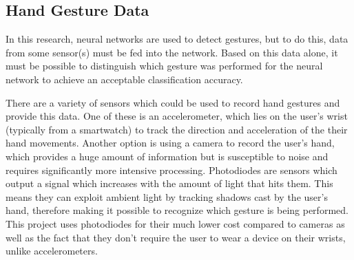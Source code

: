 \subsection{Hand Gesture Data}\label{subsec:hand-gesture-data}
In this research, neural networks are used to detect gestures, but to do this, data from some sensor(s) must be fed into the network.
Based on this data alone, it must be possible to distinguish which gesture was performed for the neural network to achieve an acceptable classification accuracy.

There are a variety of sensors which could be used to record hand gestures and provide this data.
One of these is an accelerometer, which lies on the user's wrist (typically from a smartwatch) to track the direction and acceleration of the their hand movements.
Another option is using a camera to record the user's hand, which provides a huge amount of information but is susceptible to noise and requires significantly more intensive processing.
Photodiodes are sensors which output a signal which increases with the amount of light that hits them.
This means they can exploit ambient light by tracking shadows cast by the user's hand, therefore making it possible to recognize which gesture is being performed.
This project uses photodiodes for their much lower cost compared to cameras as well as the fact that they don't require the user to wear a device on their wrists, unlike accelerometers.
